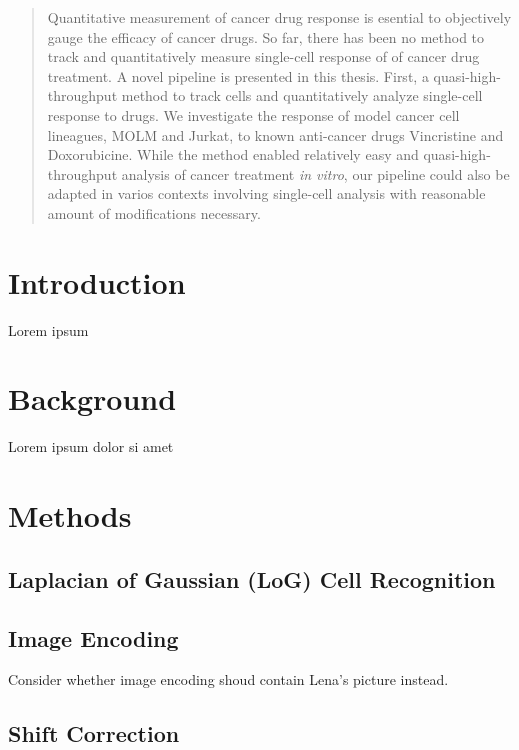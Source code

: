 \documentclass[pdftex,12pt,a4paper]{report}
\begin{document}
\newpage


\begin{abstract}
Quantitative measurement of cancer drug response is esential to objectively gauge the efficacy of cancer drugs. So far, there has been no method to track and  quantitatively measure single-cell response of of cancer drug treatment. A novel pipeline is presented in this thesis. First, a quasi-high-throughput method to track cells and quantitatively analyze single-cell response to drugs. We investigate the response of model cancer cell lineagues, MOLM and Jurkat, to known anti-cancer drugs Vincristine and Doxorubicine. While the method enabled relatively easy and quasi-high-throughput analysis of cancer treatment \textit{in vitro}, our pipeline could also be adapted in varios contexts involving single-cell analysis with reasonable amount of modifications necessary.
\end{abstract}

\newpage



\chapter{Introduction}

Lorem ipsum

\chapter{Background}

Lorem ipsum dolor si amet

\chapter{Methods}

\section{Laplacian of Gaussian (LoG) Cell Recognition}

\section{Image Encoding}

Consider whether image encoding shoud contain Lena's picture instead.

\section{Shift Correction}
\end{document}
